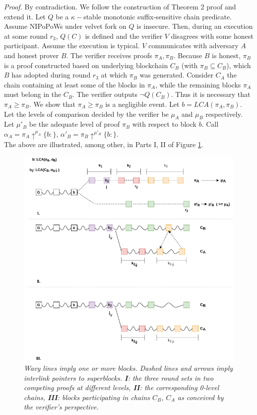 \documentclass[11pt,a4paper]{article}
\begin{document}
\textit{Proof.} By contradiction. We follow the construction of Theorem 2 proof and extend it. Let $Q$ be a $\kappa-$stable monotonic suffix-sensitive chain predicate. Assume NIPoPoWs under velvet fork on $Q$ is insecure. Then, during an execution at some round  $r_3$, $Q(C)$ is defined and the verifier $V$ disagrees with some honest participant. Assume the execution is typical. $V$ communicates with adversary $A$ and honest prover $B$. The verifier receives proofs $\pi_A, \pi_B$. Because $B$ is honest, $\pi_B$ is a proof constructed based on underlying blockchain $C_B$ (with $\pi_B \subseteq C_B$), which $B$ has adopted during round $r_3$ at which $\pi_B$ was generated. Consider $C_A$ the chain containing at least some of the blocks in $\pi_A$, while the remaining blocks $\pi_A$ must belong in the $C_B$. 
The verifier outputs $\neg Q(C_B)$. Thus it is necessary that $\pi_A \geq \pi_B$. We show that $\pi_A \geq \pi_B$ is a negligible event. 
Let $b = LCA(\pi_A, \pi_B)$. Let the levels of comparison decided by the verifier be $\mu_A$ and $\mu_B$ respectively. Let $\mu'_B$ be the adequate level of proof $\pi_B$  with respect to block $b$. Call $\alpha_A = \pi_A \uparrow^{\mu_A}\{b:\}$, 
$\alpha'_B = \pi_B \uparrow^{\mu'_B}\{b:\}$.\\
The above are illustrated, among other, in Parts I, II of Figure \ref{fig:proof_velvet}.
\begin{figure}[h!]
	\begin{center}
		\includegraphics[scale=0.5]{figures/proof_velvet.png}
	\end{center}
	\caption{\textit{ Wavy lines imply one or more blocks. Dashed lines and arrows imply interlink pointers to superblocks. \textbf{I}: the three round sets in two competing proofs at different levels, \textbf{II}: the corresponding 0-level chains, \textbf{III}: blocks participating in chains $C_B$, $C_A$ as conceived by the verifier's perspective.}}
	\label{fig:proof_velvet}
\end{figure}
\end{document}
